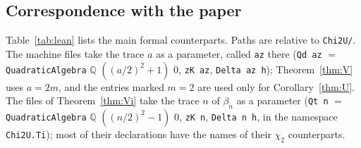 \documentclass[11pt]{amsart}
\theoremstyle{definition}
\theoremstyle{remark}
\numberwithin{equation}{section}
\newcommand{\QQ}{\mathbb{Q}}
\newcommand{\lean}[1]{{\def\_{\textunderscore\allowbreak}\texttt{#1}}}
\begin{document}
\subsection{Correspondence with the paper}
Table~\ref{tab:lean} lists the main formal counterparts. Paths are relative to \lean{Chi2U\slash{}}. The machine files
take the trace $a$ as a parameter, called \lean{az} there (\lean{Qd az} $=$ \lean{QuadraticAlgebra} $\QQ$
$((a/2)^2+1)$ $0$, \lean{zK az}, \lean{Delta az h}); Theorem~\ref{thm:V} uses $a=2m$, and the entries marked $m=2$ are
used only for Corollary~\ref{thm:U}. The files of Theorem~\ref{thm:Vi} take the trace $n$ of $\beta_n$ as a parameter
(\lean{Qt n} $=$ \lean{QuadraticAlgebra} $\QQ$ $((n/2)^2-1)$ $0$, \lean{zK n}, \lean{Delta n h}, in the namespace
\lean{Chi2U.Ti}); most of their declarations have the names of their $\chi_2$ counterparts.
\end{document}
